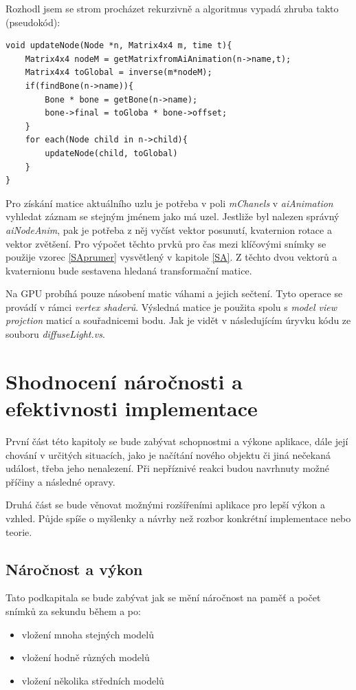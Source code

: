 Rozhodl jsem se strom procházet rekurzivně a algoritmus vypadá zhruba takto (pseudokód):  
\lstset{frame = single, language=C++, framexleftmargin=15pt,label="Algoritmus"}

\begin{lstlisting}[caption=Algoritmus pro projití stromu uzlů]
void updateNode(Node *n, Matrix4x4 m, time t){
	Matrix4x4 nodeM = getMatrixfromAiAnimation(n->name,t);
	Matrix4x4 toGlobal = inverse(m*nodeM);
	if(findBone(n->name)){
		Bone * bone = getBone(n->name);
		bone->final = toGloba * bone->offset;
	}
	for each(Node child in n->child){
		updateNode(child, toGlobal)
	}
}
\end{lstlisting}
\vspace{10pt}
Pro získání matice aktuálního uzlu je potřeba v poli \emph{mChanels} v \emph{aiAnimation} vyhledat záznam se stejným jménem jako má uzel. Jestliže byl nalezen správný \emph{aiNodeAnim}, pak je potřeba z něj vyčíst vektor posunutí, kvaternion rotace a vektor zvětšení. Pro výpočet těchto prvků pro čas mezi klíčovými snímky se použije vzorec \ref{SAprumer} vysvětlený v kapitole \ref{SA}. Z těchto dvou vektorů a kvaternionu bude sestavena hledaná transformační matice.

Na GPU probíhá pouze násobení matic váhami a jejich sečtení. Tyto operace se provádí v rámci \emph{vertex shaderů}. Výsledná matice je použita spolu s \emph{model view projction} maticí a souřadnicemi bodu. Jak je vidět v následujícím úryvku kódu ze souboru \emph{diffuseLight.vs}.
\lstset{basicstyle=\footnotesize, frame = single, language=C++, framexleftmargin=15pt,label="Algoritmus"}
\label{SA-shader}

\chapter{Shodnocení náročnosti a efektivnosti implementace}
První část této kapitoly se bude zabývat schopnostmi a výkone aplikace, dále její chování v určitých situacích, jako je načítání nového objektu či jiná nečekaná událost, třeba jeho nenalezení. Při nepříznivé reakci budou navrhnuty možné příčiny a následné opravy.

 Druhá část se bude věnovat možnými rozšířeními aplikace pro lepší výkon a vzhled. Půjde spíše o myšlenky a návrhy než rozbor konkrétní implementace nebo teorie. 
\section{Náročnost a výkon}
Tato podkapitala se bude zabývat jak se mění náročnost na paměť a počet snímků za sekundu během a po:
\begin{itemize}
\item vložení mnoha stejných modelů
\item vložení hodně různých modelů
\item vložení několika středních modelů	
\end{itemize}
